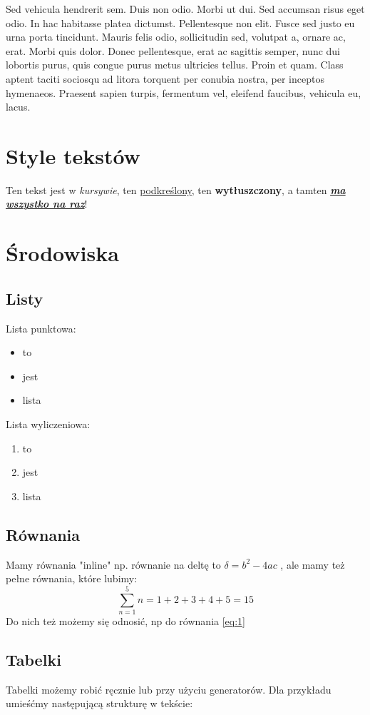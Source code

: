 \documentclass{article}
\begin{document}
Sed
vehicula hendrerit sem. Duis non odio. Morbi ut dui. Sed accumsan risus eget
odio. In hac habitasse platea dictumst. Pellentesque non elit. Fusce sed justo
eu urna porta tincidunt. Mauris felis odio, sollicitudin sed, volutpat a, ornare
ac, erat. Morbi quis dolor. Donec pellentesque, erat ac sagittis semper, nunc
dui lobortis purus, quis congue purus metus ultricies tellus. Proin et quam.
Class aptent taciti sociosqu ad litora torquent per conubia nostra, per inceptos
hymenaeos. Praesent sapien turpis, fermentum vel, eleifend faucibus, vehicula
eu, lacus.

\section{Style tekstów}
Ten tekst jest w \textit{kursywie}, ten \underline{podkreślony}, ten \textbf{wytłuszczony}, a tamten \underline{\textbf{\textit{ma wszystko na raz}}}!

\section{Środowiska}
\subsection{Listy}
Lista punktowa:
\begin{itemize}
    \item to
    \item jest
    \item lista
\end{itemize}
Lista wyliczeniowa:
\begin{enumerate}
    \item to
    \item jest
    \item lista
\end{enumerate}
\subsection{Równania}

Mamy równania "inline" np. równanie na deltę to
$ \delta = b^2 - 4ac$
, ale mamy też pełne równania, które lubimy:
\begin{equation} \label{eq:1}
 \sum^{5}_{n=1} n = 1 + 2 + 3 + 4 + 5 = 15
\end{equation}
Do nich też możemy się odnosić, np do równania \ref{eq:1}
\subsection{Tabelki}
Tabelki możemy robić ręcznie lub przy użyciu generatorów. Dla przykładu
umieśćmy następującą strukturę w tekście:
\end{document}
